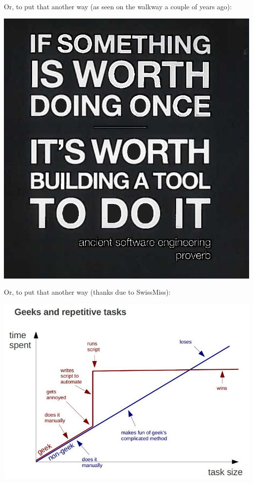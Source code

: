 \documentclass[handout]{beamer}
\begin{document}
\begin{frame}
Or, to put that another way (as seen on the walkway a couple of years ago):

\centering
\vspace{10pt}
\includegraphics[height=0.8\textheight]{Build.png}

\end{frame}


\begin{frame}
Or, to put that another way
(thanks due to SwissMiss):

\centering
\vspace{10pt}
\includegraphics[height=0.8\textheight]{Geeks.jpg}

\end{frame}
\end{document}
